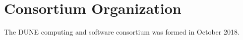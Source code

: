 \section{Consortium Organization}

The DUNE computing and software consortium was formed in October 2018.  
















